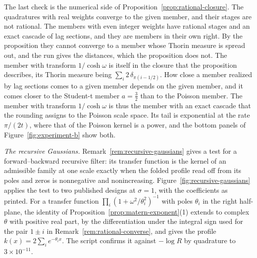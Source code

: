 \begin{example}
The last check is the numerical side of Proposition~\ref{prop:rational-closure}. The
quadratures with real weights converge to the given member, and their stages are not rational.
The members with even integer weights have rational stages and an exact cascade of lag
sections, and they are members in their own right. By the proposition they cannot converge to
a member whose Thorin measure is spread out, and the run gives the distances, which the
proposition does not. The member with transform $1/\cosh\omega$ is itself in the closure that
the proposition describes, its Thorin measure being $\sum_i 2\,\delta_{\pi(i - 1/2)}$. How
close a member realized by lag sections comes to a given member depends on the given member, and
it comes closer to the Student-t member $a = \tfrac32$ than to the Poisson member. The member
with transform
$1/\cosh\omega$ is thus the member with an exact cascade that the rounding assigns to the
Poisson scale space. Its tail is exponential at the rate $\pi/(2t)$, where that of the
Poisson kernel is a power, and the bottom panels of Figure~\ref{fig:experiment-b} show both.

\emph{The recursive Gaussians.} Remark~\ref{rem:recursive-gaussians} gives a test for a
forward--backward recursive filter: its transfer function is the kernel of an admissible
family at one scale exactly when the folded profile read off from its poles and zeros is
nonnegative and nonincreasing. Figure~\ref{fig:recursive-gaussians} applies the test to two
published designs at $\sigma = 1$, with the coefficients as printed. For a transfer function
$\prod_i(1 + \omega^2/\theta_i^2)^{-1}$ with poles $\theta_i$ in the right half-plane, the
identity of Proposition~\ref{prop:matern-exponent}(1) extends to complex $\theta$ with
positive real part, by the differentiation under the integral sign used for the pair
$1 \pm i$ in Remark~\ref{rem:rational-converse}, and gives the profile
$k(x) = 2\sum_i e^{-\theta_ix}$. The script confirms it against $-\log R$ by quadrature to
$3 \times 10^{-11}$.


\end{example}

